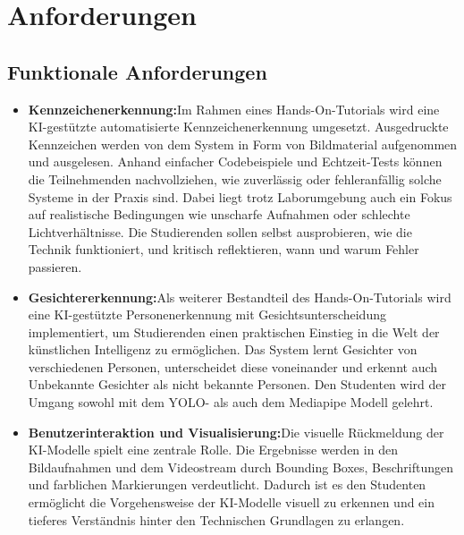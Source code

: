 \section{Anforderungen}
\subsection{Funktionale Anforderungen}
\begin{itemize}
    \item \textbf{Kennzeichenerkennung:}Im Rahmen eines Hands-On-Tutorials wird eine KI-gestützte automatisierte Kennzeichenerkennung umgesetzt. Ausgedruckte Kennzeichen werden von dem System in Form von Bildmaterial aufgenommen und ausgelesen. Anhand einfacher Codebeispiele und Echtzeit-Tests können die Teilnehmenden nachvollziehen, wie zuverlässig oder fehleranfällig solche Systeme in der Praxis sind. Dabei liegt trotz Laborumgebung auch ein Fokus auf realistische Bedingungen wie unscharfe Aufnahmen oder schlechte Lichtverhältnisse. Die Studierenden sollen selbst ausprobieren, wie die Technik funktioniert, und kritisch reflektieren, wann und warum Fehler passieren. 
    \item \textbf{Gesichtererkennung:}Als weiterer Bestandteil des Hands-On-Tutorials wird eine KI-gestützte Personenerkennung mit Gesichtsunterscheidung implementiert, um Studierenden einen praktischen Einstieg in die Welt der künstlichen Intelligenz zu ermöglichen. Das System lernt Gesichter von verschiedenen Personen, unterscheidet diese voneinander und erkennt auch Unbekannte Gesichter als nicht bekannte Personen. Den Studenten wird der Umgang sowohl mit dem YOLO- als auch dem Mediapipe Modell gelehrt. 
    \item \textbf{Benutzerinteraktion und Visualisierung:}Die visuelle Rückmeldung der KI-Modelle spielt eine zentrale Rolle. Die Ergebnisse werden in den Bildaufnahmen und dem Videostream durch Bounding Boxes, Beschriftungen und farblichen Markierungen verdeutlicht. Dadurch ist es den Studenten ermöglicht die Vorgehensweise der KI-Modelle visuell zu erkennen und ein tieferes Verständnis hinter den Technischen Grundlagen zu erlangen. 
\end{itemize}

